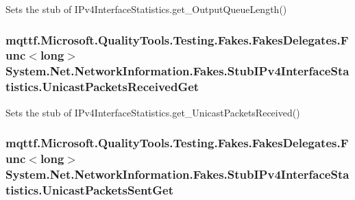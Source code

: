 Sets the stub of I\-Pv4\-Interface\-Statistics.\-get\-\_\-\-Output\-Queue\-Length()

\hypertarget{class_system_1_1_net_1_1_network_information_1_1_fakes_1_1_stub_i_pv4_interface_statistics_a4dc18aa1988fd7bf0ac15db8987cd335}{
\subsubsection[{Unicast\-Packets\-Received\-Get}]{\setlength{\rightskip}{0pt plus 5cm}mqttf.\-Microsoft.\-Quality\-Tools.\-Testing.\-Fakes.\-Fakes\-Delegates.\-Func$<$long$>$ System.\-Net.\-Network\-Information.\-Fakes.\-Stub\-I\-Pv4\-Interface\-Statistics.\-Unicast\-Packets\-Received\-Get}}\label{class_system_1_1_net_1_1_network_information_1_1_fakes_1_1_stub_i_pv4_interface_statistics_a4dc18aa1988fd7bf0ac15db8987cd335}


Sets the stub of I\-Pv4\-Interface\-Statistics.\-get\-\_\-\-Unicast\-Packets\-Received()

\hypertarget{class_system_1_1_net_1_1_network_information_1_1_fakes_1_1_stub_i_pv4_interface_statistics_a65f87713c1a0badf62a3dee82583ddcb}{
\subsubsection[{Unicast\-Packets\-Sent\-Get}]{\setlength{\rightskip}{0pt plus 5cm}mqttf.\-Microsoft.\-Quality\-Tools.\-Testing.\-Fakes.\-Fakes\-Delegates.\-Func$<$long$>$ System.\-Net.\-Network\-Information.\-Fakes.\-Stub\-I\-Pv4\-Interface\-Statistics.\-Unicast\-Packets\-Sent\-Get}}\label{class_system_1_1_net_1_1_network_information_1_1_fakes_1_1_stub_i_pv4_interface_statistics_a65f87713c1a0badf62a3dee82583ddcb}


